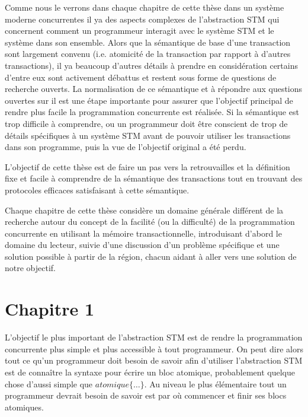 Comme nous le verrons dans chaque chapitre de cette thèse dans un système moderne concurrentes
il ya des aspects complexes de l'abstraction STM qui concernent comment un programmeur interagit avec le système STM et le système dans son ensemble.
Alors que la sémantique de base d'une transaction sont largement convenu (i.e. atomicité de la transaction par rapport à d'autres transactions),
il ya beaucoup d'autres détails à prendre en considération certains d'entre eux sont activement débattus et restent sous forme de questions de recherche ouverts.
La normalisation de ce sémantique et à répondre aux questions ouvertes sur il est une étape importante pour assurer
que l'objectif principal de rendre plus facile la programmation concurrente est réalisée.
Si la sémantique est trop difficile à comprendre, ou un programmeur doit être conscient de trop de détails spécifiques à un système
STM avant de pouvoir utiliser les transactions dans son programme, puis la vue de l'objectif original a été perdu.



L'objectif de cette thèse est de faire un pas vers la retrouvailles et la définition fixe et facile à
comprendre de la sémantique des transactions tout en trouvant des protocoles efficaces satisfaisant à cette sémantique.



Chaque chapitre de cette thèse considère un domaine générale différent de la recherche autour du concept de la facilité
(ou la difficulté) de la programmation concurrente en utilisant la mémoire transactionnelle, introduisant d'abord le domaine du lecteur,
suivie d'une discussion d'un problème spécifique et une solution possible à partir de la région, chacun aidant à aller vers une solution de notre objectif.



\section{Chapitre 1}

L'objectif le plus important de l'abstraction STM est de rendre la programmation concurrente plus simple et plus accessible à tout programmeur.
On peut dire alors tout ce qu'un programmeur doit besoin de savoir afin d'utiliser l'abstraction STM est
de connaître la syntaxe pour écrire un bloc atomique, probablement quelque chose d'aussi simple que $atomique\{ \dots \}$.
Au niveau le plus élémentaire tout un programmeur devrait besoin de savoir est par où commencer et finir ses blocs atomiques.

